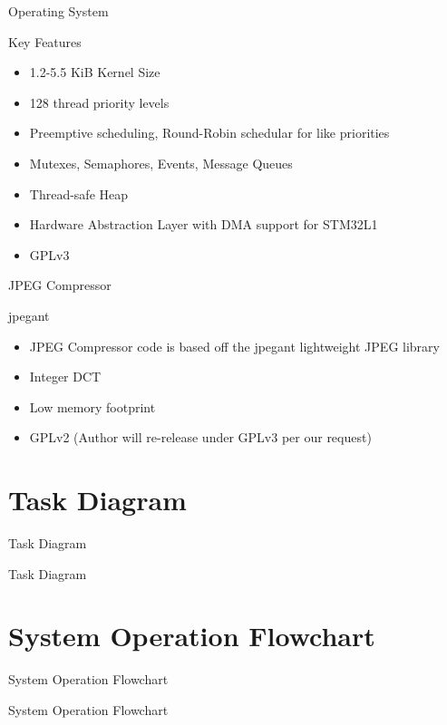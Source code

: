 \documentclass{beamer}
\begin{document}
\begin{frame}{Operating System}
	\begin{block}{Key Features}
		\begin{itemize}
			\item 1.2-5.5 KiB Kernel Size
			\item 128 thread priority levels
			\item Preemptive scheduling, Round-Robin schedular for like priorities
			\item Mutexes, Semaphores, Events, Message Queues
			\item Thread-safe Heap
			\item Hardware Abstraction Layer with DMA support for STM32L1
			\item GPLv3
		\end{itemize}
	\end{block}
\end{frame}

\begin{frame}{JPEG Compressor}
	\begin{block}{jpegant}
		\begin{itemize}
			\item JPEG Compressor code is based off the jpegant lightweight JPEG library
			\item Integer DCT
			\item Low memory footprint
			\item GPLv2 (Author will re-release under GPLv3 per our request)
		\end{itemize}
	\end{block}
\end{frame}

\section{Task Diagram}
\begin{frame}{Task Diagram}
	\begin{center}
		\large{Task Diagram}
	\end{center}
\end{frame}

\section{System Operation Flowchart}
\begin{frame}{System Operation Flowchart}
	\begin{center}
		\large{System Operation Flowchart}
	\end{center}
\end{frame}
\end{document}
